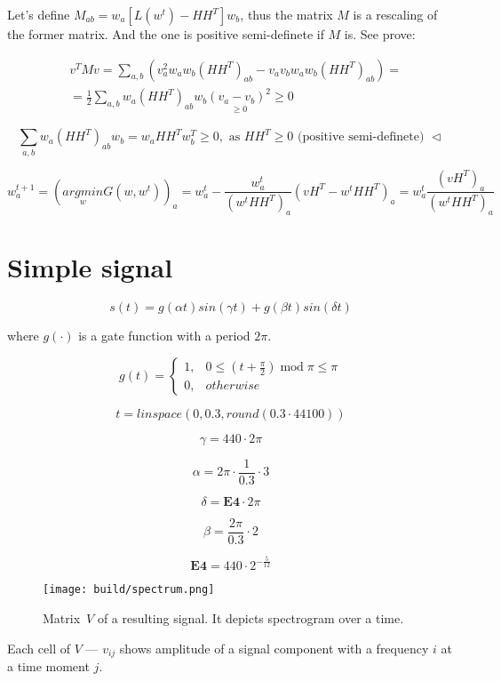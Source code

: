 \documentclass[oneside, final, 14pt]{extarticle}
\begin{document}
Let's define $M_{ab} = w_a [ L(w^t) - H H^T] w_b$,
thus the matrix $M$ is a rescaling of the former matrix.
And the one is positive semi-definete if $M$ is. See prove:

\begin{align*}
  & v^T M v = \sum_{a,b} \left(
    v^2_a w_a w_b (H H^T)_{ab}
      - v_a v_b w_a w_b (H H^T)_{ab}
  \right) = \\
  & = \frac{1}{2} \sum_{a,b} w_a (H H^T)_{ab} w_b
    \underset{\geqslant 0}{(v_a - v_b)^2}
  \geqslant 0
\end{align*}

\[
  \sum_{a,b} w_a (H H^T)_{ab} w_b = w_a H H^T w_b^T \geqslant 0,
  \text{ as } H H^T \geqslant 0
    \text{ (positive semi-definete) }
  \lhd
\]

\[
  w^{t+1}_a = \left(
    \underset{w}{argmin} G(w, w^t)
  \right)_a
  = w^t_a -
    \frac
      {w_a^t}
      {(w^t H H^T)_a}
  (v H^T - w^t H H^T)_a
  = w_a^t \frac{(v H^T)_a}{(w^t H H^T)_a}
\]

\section{Simple signal}

\[
  s(t) = g(\alpha t) sin(\gamma t) + g(\beta t) sin(\delta t)
\]

where $g(\cdot)$ is a gate function with a period $2\pi$.

\[
  g(t) =
  \begin{cases}
    1, & 0 \leqslant \left( t + \frac{\pi}{2} \right)
      \; \text{mod} \; \pi \leqslant \pi \\
    0, & otherwise
  \end{cases}
\]

$$t = linspace(0, 0.3, round(0.3 \cdot 44100))$$

$$\gamma = 440 \cdot 2 \pi$$

$$\alpha = 2 \pi \cdot \frac{1}{0.3} \cdot 3$$

$$\delta = \textbf{E4} \cdot 2 \pi$$

$$\beta = \frac{2 \pi}{0.3} \cdot 2$$

$$\textbf{E4} = 440 \cdot 2^{-\frac{5}{12}}$$

\begin{figure}
  \texttt{[image: build/spectrum.png]}
  \caption{Matrix~$V$ of a resulting signal.
  It depicts spectrogram over a time.}
\end{figure}

Each cell of $V$ --- $v_{ij}$ shows amplitude
of a signal component with a frequency $i$
at a time moment $j$.
\end{document}
